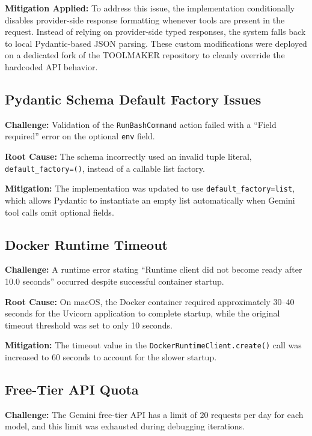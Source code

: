 \documentclass[11pt]{article}
\begin{document}
\textbf{Mitigation Applied:} To address this issue, the implementation conditionally disables provider-side response formatting whenever tools are present in the request. Instead of relying on provider-side typed responses, the system falls back to local Pydantic-based JSON parsing. These custom modifications were deployed on a dedicated fork of the TOOLMAKER repository to cleanly override the hardcoded API behavior.



\subsection{Pydantic Schema Default Factory Issues}

\textbf{Challenge:} Validation of the \texttt{RunBashCommand} action failed with a ``Field required'' error on the optional \texttt{env} field.

\textbf{Root Cause:} The schema incorrectly used an invalid tuple literal, \texttt{default\_factory=()}, instead of a callable list factory.

\textbf{Mitigation:} The implementation was updated to use \texttt{default\_factory=list}, which allows Pydantic to instantiate an empty list automatically when Gemini tool calls omit optional fields.

\subsection{Docker Runtime Timeout}

\textbf{Challenge:} A runtime error stating ``Runtime client did not become ready after 10.0 seconds'' occurred despite successful container startup.

\textbf{Root Cause:} On macOS, the Docker container required approximately 30--40 seconds for the Uvicorn application to complete startup, while the original timeout threshold was set to only 10 seconds.

\textbf{Mitigation:} The timeout value in the \texttt{DockerRuntimeClient.create()} call was increased to 60 seconds to account for the slower startup.

\subsection{Free-Tier API Quota}

\textbf{Challenge:} The Gemini free-tier API has a limit of 20 requests per day for each model, and this limit was exhausted during debugging iterations.
\end{document}
